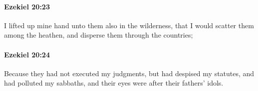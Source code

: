		\paragraph{Ezekiel 20:23} %
			\label{EZEKIEL-20-23}

			I lifted up mine hand unto them also in the wilderness, that I would scatter them among the heathen, and disperse them through the countries;


		\paragraph{Ezekiel 20:24} %
			\label{EZEKIEL-20-24}

			Because they had not executed my judgments, but had despised my statutes, and had polluted my sabbaths, and their eyes were after their fathers’ idols.


